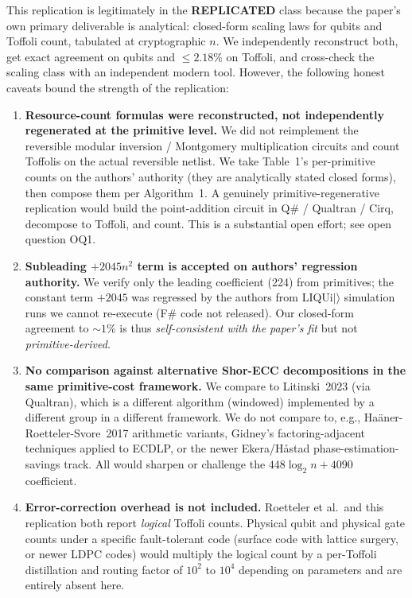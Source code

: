 \documentclass[11pt]{article}
\begin{document}
This replication is legitimately in the \textbf{REPLICATED} class because the
paper's own primary deliverable is analytical: closed-form scaling laws for
qubits and Toffoli count, tabulated at cryptographic $n$. We independently
reconstruct both, get exact agreement on qubits and $\le 2.18\%$ on Toffoli, and
cross-check the scaling class with an independent modern tool. However, the
following honest caveats bound the strength of the replication:

\begin{enumerate}
  \item \textbf{Resource-count formulas were reconstructed, not independently regenerated at the primitive level.} We did not reimplement the reversible modular inversion / Montgomery multiplication circuits and count Toffolis on the actual reversible netlist. We take Table~1's per-primitive counts on the authors' authority (they are analytically stated closed forms), then compose them per Algorithm~1. A genuinely primitive-regenerative replication would build the point-addition circuit in Q\# / Qualtran / Cirq, decompose to Toffoli, and count. This is a substantial open effort; see open question OQ1.
  \item \textbf{Subleading $+2045 n^2$ term is accepted on authors' regression authority.} We verify only the leading coefficient (224) from primitives; the constant term $+2045$ was regressed by the authors from LIQUi$|\rangle$ simulation runs we cannot re-execute (F\# code not released). Our closed-form agreement to $\sim 1\%$ is thus \emph{self-consistent with the paper's fit} but not \emph{primitive-derived}.
  \item \textbf{No comparison against alternative Shor-ECC decompositions in the same primitive-cost framework.} We compare to Litinski~2023 (via Qualtran), which is a different algorithm (windowed) implemented by a different group in a different framework. We do not compare to, e.g., Ha\"{a}ner-Roetteler-Svore~2017 arithmetic variants, Gidney's factoring-adjacent techniques applied to ECDLP, or the newer Ekera/H\aa stad phase-estimation-savings track. All would sharpen or challenge the $448 \log_2 n + 4090$ coefficient.
  \item \textbf{Error-correction overhead is not included.} Roetteler et al.\ and this replication both report \emph{logical} Toffoli counts. Physical qubit and physical gate counts under a specific fault-tolerant code (surface code with lattice surgery, or newer LDPC codes) would multiply the logical count by a per-Toffoli distillation and routing factor of $10^2$ to $10^4$ depending on parameters and are entirely absent here.

\end{enumerate}
\end{document}
